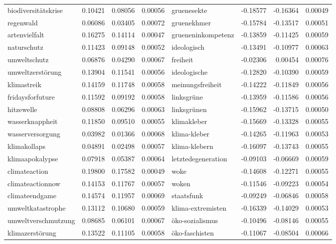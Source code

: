 \begin{table}
\begin{tabular}[t]{lrr>{}rlrrr}
biodiversitätskrise & 0.10421 & 0.08056 & 0.00056 & gruenesekte & -0.18577 & -0.16364 & 0.00049\\
regenwald & 0.06086 & 0.03405 & 0.00072 & gruenekhmer & -0.15784 & -0.13517 & 0.00051\\
\addlinespace
artenvielfalt & 0.16275 & 0.14114 & 0.00047 & grueneninkompetenz & -0.13859 & -0.11425 & 0.00059\\
naturschutz & 0.11423 & 0.09148 & 0.00052 & ideologisch & -0.13491 & -0.10977 & 0.00063\\
umweltschutz & 0.06876 & 0.04290 & 0.00067 & freiheit & -0.02306 & 0.00454 & 0.00076\\
umweltzerstörung & 0.13904 & 0.11541 & 0.00056 & ideologische & -0.12820 & -0.10390 & 0.00059\\
klimastreik & 0.14159 & 0.11748 & 0.00058 & meinungsfreiheit & -0.14222 & -0.11849 & 0.00056\\
\addlinespace
fridaysforfuture & 0.11592 & 0.09192 & 0.00058 & linksgrüne & -0.13959 & -0.11586 & 0.00056\\
hitzewelle & 0.08808 & 0.06296 & 0.00063 & linksgrünen & -0.15962 & -0.13715 & 0.00050\\
wasserknappheit & 0.11850 & 0.09510 & 0.00055 & klimakleber & -0.15669 & -0.13328 & 0.00055\\
wasserversorgung & 0.03982 & 0.01366 & 0.00068 & klima-kleber & -0.14265 & -0.11963 & 0.00053\\
klimakollaps & 0.04891 & 0.02498 & 0.00057 & klima-klebern & -0.16097 & -0.13743 & 0.00055\\
\addlinespace
klimaapokalypse & 0.07918 & 0.05387 & 0.00064 & letztedegeneration & -0.09103 & -0.06669 & 0.00059\\
climateaction & 0.19800 & 0.17582 & 0.00049 & woke & -0.14608 & -0.12271 & 0.00055\\
climateactionnow & 0.14153 & 0.11767 & 0.00057 & woken & -0.11546 & -0.09223 & 0.00054\\
climateendgame & 0.14574 & 0.11957 & 0.00069 & staatsfunk & -0.09249 & -0.06846 & 0.00058\\
umweltkatastrophe & 0.13112 & 0.10680 & 0.00059 & klima-extremisten & -0.16339 & -0.14029 & 0.00053\\
\addlinespace
umweltverschmutzung & 0.08685 & 0.06101 & 0.00067 & öko-sozialismus & -0.10496 & -0.08146 & 0.00055\\
klimazerstörung & 0.13522 & 0.11105 & 0.00058 & öko-faschisten & -0.11067 & -0.08504 & 0.00066\\

\end{tabular}
\end{table}
